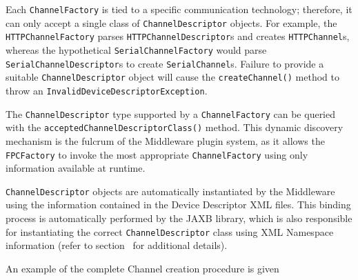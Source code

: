 Each \texttt{ChannelFactory} is tied to a specific communication technology; therefore, it can only accept a single class of \texttt{ChannelDescriptor} objects. For example, the \texttt{HTTPChannelFactory} parses \texttt{HTTPChannelDescriptor}s and creates \texttt{HTTPChannel}s, whereas the hypothetical \texttt{SerialChannelFactory} would parse \texttt{SerialChannelDescriptor}s to create \texttt{SerialChannel}s. Failure to provide a suitable \texttt{ChannelDescriptor} object will cause the \texttt{createChannel()} method to throw an \texttt{InvalidDeviceDescriptorException}.

The \texttt{ChannelDescriptor} type supported by a \texttt{ChannelFactory} can be queried with the \texttt{acceptedChannelDescriptorClass()} method. This dynamic discovery mechanism is the fulcrum of the Middleware plugin system, as it allows the \texttt{FPCFactory} to invoke the most appropriate \texttt{ChannelFactory} using only information available at runtime.

\texttt{ChannelDescriptor} objects are automatically instantiated by the Middleware using the information contained in the Device Descriptor XML files. This binding process is automatically performed by the JAXB library, which is also responsible for instantiating the correct \texttt{ChannelDescriptor} class using XML Namespace information (refer to section~\label{sec:newmiddleware.descriptor} for additional details).

An example of the complete Channel creation procedure is given 

